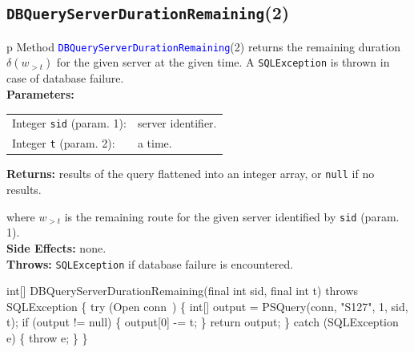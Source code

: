 \subsection{\texttt{DBQueryServerDurationRemaining}(2)}
\begin{tabular}{p{\textwidth}}
\toprule
{}
Method \textcolor{blue}{{\tt{}\protect{}DBQueryServerDurationRemaining}}(2) returns the
remaining duration $\delta(w_{>t})$ for the given server at the given time.
A {\tt{}SQLException} is thrown in case of database failure.\\
\midrule
\textbf{Parameters:} \\
\begin{tabular}{lp{116mm}}
Integer {\tt{}sid} (param. 1):&server identifier.\\
Integer {\tt{}t} (param. 2):&a time.\\
\end{tabular}
\textbf{Returns:} results of the query flattened into an integer array,
or {\tt{}null} if no results.


where $w_{>t}$ is the remaining route for the given server identified by {\tt{}sid} (param. 1).\\
\textbf{Side Effects:} none.\\
\textbf{Throws:} {\tt{}SQLException} if database failure is encountered.\\
\bottomrule
\end{tabular}
\nwenddocs{}\endmoddef{}
int[] DBQueryServerDurationRemaining(final int sid, final int t)
throws SQLException \{
  try (\LA{}Open \code{}conn\edoc{}~{\nwtagstyle{}}\RA{}) \{
    int[] output = PSQuery(conn, "S127", 1, sid, t);
    if (output != null) \{
      output[0] -= t;
    \}
    return output;
  \} catch (SQLException e) \{
    throw e;
  \}
\}
\eatline
